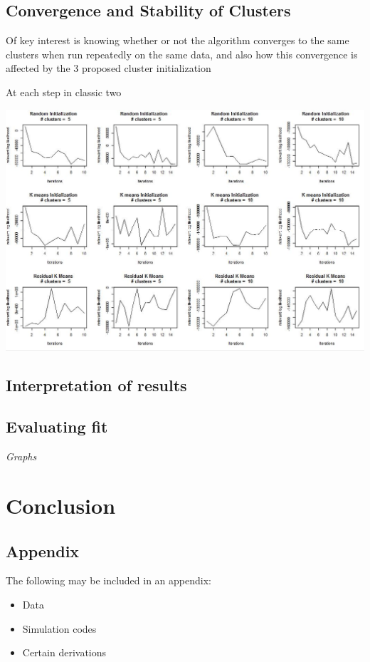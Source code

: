 \documentclass[12pt]{article}
\begin{document}
\subsection{Convergence and Stability of Clusters}

Of key interest is knowing whether or not the algorithm converges to the same clusters when run repeatedly on the same data, and also how this convergence is affected by the 3 proposed cluster initialization 

At each step in classic two 


\includegraphics[width=\linewidth]{Images/LikelihoodOfClusters_Iterations}





\subsection{Interpretation of results}
\subsection{Evaluating fit}



\emph{Graphs}

\section{Conclusion}\label{conclusion}







\newpage

\begin{appendix}
\section{Appendix}

\vspace{4mm}\noindent 
The following may be included in an appendix:

\begin{itemize}
\item[] Data 
\item[] Simulation codes
\item[] Certain derivations
\end{itemize}
\end{appendix}
\newpage
\end{document}
